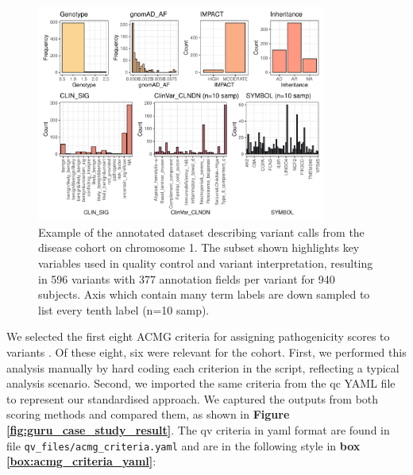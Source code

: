 \begin{figure}[!h]
    \centering
   \includegraphics[width=0.85\textwidth]{./images/Guru_singlecase_distribution_variables.pdf}
       \caption{Example of the annotated dataset describing variant calls from the disease cohort on chromosome 1. The subset shown highlights key variables used in quality control and variant interpretation, resulting in 596 variants with 377 annotation fields per variant for 940 subjects. Axis which contain many term labels are down sampled to list every tenth  label (n=10 samp).}
    \label{fig:guru_case_study_setup}
\end{figure}

We selected the first eight ACMG criteria for assigning pathogenicity scores to variants \cite{richards2015standards}. Of these eight, six were relevant for the cohort.
First, we performed this analysis manually by hard coding each criterion in the script, reflecting a typical analysis scenario. Second, we imported the same criteria from the \ac{qc} YAML file to represent our standardised approach. We captured the outputs from both scoring methods and compared them, as shown in \textbf{Figure \ref{fig:guru_case_study_result}}.
The \ac{qv} criteria in yaml format are found in file \texttt{qv\_files/acmg\_criteria.yaml} and are in the following style in 
\textbf{box \ref{box:acmg_criteria_yaml}}:


